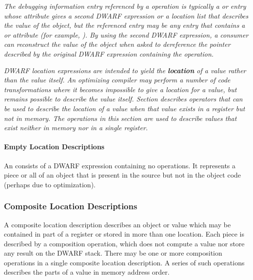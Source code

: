 \begin{enumerate}[1. ]
\textit{The debugging information entry referenced by a 
\DWOPimplicitpointerNAME{} operation is typically a
\DWTAGvariable{} or \DWTAGformalparameter{} entry whose
\DWATlocation{} attribute gives a second DWARF expression or a
location list that describes the value of the object, but the
referenced entry may be any entry that contains a \DWATlocation{}
or \DWATconstvalue{} attribute (for example, \DWTAGdwarfprocedure).
By using the second DWARF expression, a consumer can
reconstruct the value of the object when asked to dereference
the pointer described by the original DWARF expression
containing the \DWOPimplicitpointer{} operation.}

\end{enumerate}

\textit{DWARF location expressions are intended to yield the \textbf{location}
of a value rather than the value itself. An optimizing compiler
may perform a number of code transformations where it becomes
impossible to give a location for a value, but remains possible
to describe the value itself. 
Section 
describes operators that can be used to
describe the location of a value when that value exists in a
register but not in memory. The operations in this section are
used to describe values that exist neither in memory nor in a
single register.}

\paragraph{Empty Location Descriptions}

An 
consists of a DWARF expression
containing no operations. It represents a piece or all of an
object that is present in the source but not in the object code
(perhaps due to optimization).

\subsubsection{Composite Location Descriptions}
A composite location description describes an object or
value which may be contained in part of a register or stored
in more than one location. Each piece is described by a
composition operation, which does not compute a value nor
store any result on the DWARF stack. There may be one or
more composition operations in a single composite location
description. A series of such operations describes the parts
of a value in memory address order.

